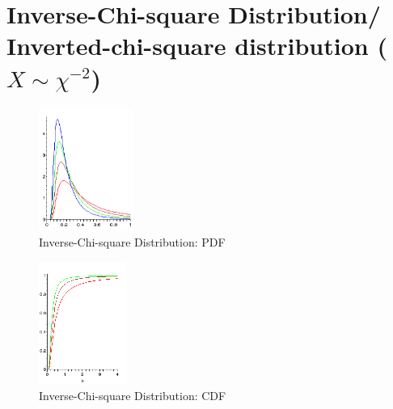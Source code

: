\section{Inverse-Chi-square Distribution/ Inverted-chi-square distribution ($X \sim \chi^{-2}$) \cite{wiki/Inverse-chi-squared_distribution}} \label{Inverse-Chi-square Distribution/ Inverted-chi-square distribution}



\begin{table}[H]
    \begin{minipage}{0.49\linewidth}
        \begin{figure}[H]
            \centering
            \includegraphics[width=\linewidth, height=4cm, keepaspectratio]{Pictures/distributions/Inverse_chi_squared_pdf.png}
            \caption{Inverse-Chi-square Distribution: PDF}
        \end{figure}
    \end{minipage}
    \hfill
    \begin{minipage}{0.49\linewidth}
        \begin{figure}[H]
            \centering
            \includegraphics[width=\linewidth, height=4cm, keepaspectratio]{Pictures/distributions/Inverse_chi_squared_cdf.png}
            \caption{Inverse-Chi-square Distribution: CDF}
        \end{figure}
    \end{minipage}
\end{table}

